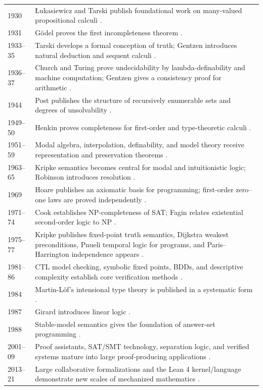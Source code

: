 \begin{longtable}{@{}p{}p{}@{}}
1930 & \L{}ukasiewicz and Tarski publish foundational work on many-valued
propositional calculi \cite{LukasiewiczTarski1930}. \\
1931 & G\"odel proves the first incompleteness theorem
\cite{Godel1931}. \\
1933--35 & Tarski develops a formal conception of truth; Gentzen introduces
natural deduction and sequent calculi \cite{Tarski1983,Gentzen1934a,
Gentzen1935b}. \\
1936--37 & Church and Turing prove undecidability by lambda-definability and
machine computation; Gentzen gives a consistency proof for arithmetic
\cite{Church1936,Turing1937,Gentzen1936}. \\
1944 & Post publishes the structure of recursively enumerable sets and degrees
of unsolvability \cite{Post1944}. \\
1949--50 & Henkin proves completeness for first-order and type-theoretic
calculi \cite{Henkin1949,Henkin1950}. \\
1951--59 & Modal algebra, interpolation, definability, and model theory receive
representation and preservation theorems \cite{JonssonTarski1951,Craig1957,
Beth1953,Tennenbaum1959}. \\
1963--65 & Kripke semantics becomes central for modal and intuitionistic logic;
Robinson introduces resolution \cite{Kripke1963,Kripke1965,Robinson1965}. \\
1969 & Hoare publishes an axiomatic basis for programming; first-order
zero--one laws are proved independently \cite{Hoare1969,GlebskiiEtAl1969}. \\
1971--74 & Cook establishes NP-completeness of SAT; Fagin relates existential
second-order logic to NP \cite{Cook1971,Fagin1974}. \\
1975--77 & Kripke publishes fixed-point truth semantics, Dijkstra weakest
preconditions, Pnueli temporal logic for programs, and Paris--Harrington
independence appears \cite{Kripke1975,Dijkstra1975,Pnueli1977,
ParisHarrington1977}. \\
1981--86 & CTL model checking, symbolic fixed points, BDDs, and descriptive
complexity establish core verification methods \cite{ClarkeEmerson1981,
Vardi1982,Bryant1986,Immerman1986}. \\
1984 & Martin-L\"of's intensional type theory is published in a systematic
form \cite{MartinLof1984}. \\
1987 & Girard introduces linear logic \cite{Girard1987}. \\
1988 & Stable-model semantics gives the foundation of answer-set programming
\cite{GelfondLifschitz1988}. \\
2001--09 & Proof assistants, SAT/SMT technology, separation logic, and verified
systems mature into large proof-producing applications
\cite{ReynoldsSeparation2002,DeMouraBjorner2008,Leroy2009,KleinEtAl2009}. \\
2013--21 & Large collaborative formalizations and the Lean 4 kernel/language
demonstrate new scales of mechanized mathematics
\cite{GonthierEtAl2013,DeMouraUllrich2021}. \\
\bottomrule
\end{longtable}

